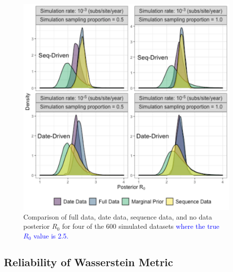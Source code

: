 \documentclass{article}
\begin{document}
\begin{figure}[H]
\centering
\includegraphics[width=1\linewidth]{../figures/postEg.pdf}
\caption{Comparison of full data, date data, sequence data, and no data posterior $R_0$ for four of the 600 simulated datasets \textcolor{blue}{where the true $R_0$ value is 2.5.} }
\label{fig:posts}
\end{figure}
\subsection*{Reliability of Wasserstein Metric}
\end{document}
